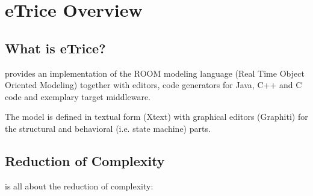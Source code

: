 \section{eTrice{} Overview}

\subsection{What is eTrice{}?}

\eTrice{} provides an implementation of the ROOM modeling language (Real Time Object Oriented Modeling) 
together with editors, code generators for Java, C++ and C code and exemplary target middleware.

The model is defined in textual form (Xtext) with graphical editors (Graphiti) for the structural and 
behavioral (i.e. state machine) parts.

\subsection{Reduction of Complexity}

\eTrice{} is all about the reduction of complexity:


